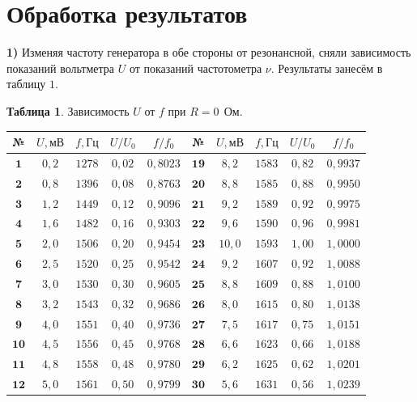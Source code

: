 \documentclass[11pt,a4paper]{article}
\begin{document}
\part*{Обработка результатов}
\textbf{1)} Изменяя частоту генератора в обе стороны от резонансной, сняли зависимость показаний вольтметра $U$ от показаний частотометра $\nu$. Результаты занесём в таблицу $1$.
	\begin{table}[h!]
	\begin{center}
		\textbf{Таблица 1}. Зависимость $U$ от $f$ при $R=0 \ \ \text{Ом}$.\\
		\begin{tabular}{|c|c|c|c|c|c|c|c|c|c|}
			\hline
№ & $U,\text{мВ}$ & $f,\text{Гц}$ &$U/U_0$ &$f/f_0$ & № & $U,\text{мВ}$ & $f,\text{Гц}$ &$U/U_0$ &$f/f_0$ \\ \hline
$\textbf{1}$ & $0,2$ &	$1278$ &$0,02$ & $0,8023$ & $\textbf{19}$ & $8,2$ & $1583$ & $0,82$ & $0,9937$\\ \hline
$\textbf{2}$ & $0,8$ &	$1396$ &$0,08$ & $0,8763$ & $\textbf{20}$ & $8,8$ & $1585$ & $0,88$ & $0,9950$\\ \hline
$\textbf{3}$ & $1,2$ &	$1449$ & $0,12$ & $0,9096$ & $\textbf{21}$ & $9,2$ & $1589$ & $0,92$ & $0,9975$ \\ \hline
$\textbf{4}$ & $1,6$ &  $1482$ & $0,16$ & $0,9303$ & $\textbf{22}$ & $9,6$ & $1590$ & $0,96$ & $0,9981$\\ \hline
$\textbf{5}$ & $2,0$ &  $1506$  & $0,20$ & $0,9454$ & $\textbf{23}$& $10,0$ & $1593$ & $1,00$ & $1,0000$\\ \hline
$\textbf{6}$ & $2,5$ &	$1520$ & $0,25$ & $0,9542$ & $\textbf{24}$ & $9,2$ & $1607$ & $0,92$ & $1,0088$\\ \hline
$\textbf{7}$ & $3,0$ &	$1530$ & $0,30$ & $0,9605$ & $\textbf{25}$ & $8,8$ & $1609$ & $0,88$ & $1,0100$\\ \hline
$\textbf{8}$ & $3,2$ &	$1543$ & $0,32$ & $0,9686$ & $\textbf{26}$ & $8,0$ & $1615$ & $0,80$ & $1,0138$\\ \hline
$\textbf{9}$ & $4,0$ &	$1551$ & $0,40$ & $0,9736$ & $\textbf{27}$ & $7,5$ & $1617$ & $0,75$ & $1,0151$\\ \hline
$\textbf{10}$ & $4,5$ &	$1556$ & $0,45$ & $0,9768$ & $\textbf{28}$ & $6,6$ & $1623$ & $0,66$ & $1,0188$\\ \hline
$\textbf{11}$ & $4,8$ &	$1558$ & $0,48$ & $0,9780$ & $\textbf{29}$ & $6,2$ & $1625$ & $0,62$ & $1,0201$\\ \hline
$\textbf{12}$ & $5,0$ &	$1561$ & $0,50$ & $0,9799$ & $\textbf{30}$ & $5,6$ & $1631$ & $0,56$ & $1,0239$ \\ \hline

\end{tabular}
\end{center}
\end{table}
\end{document}
